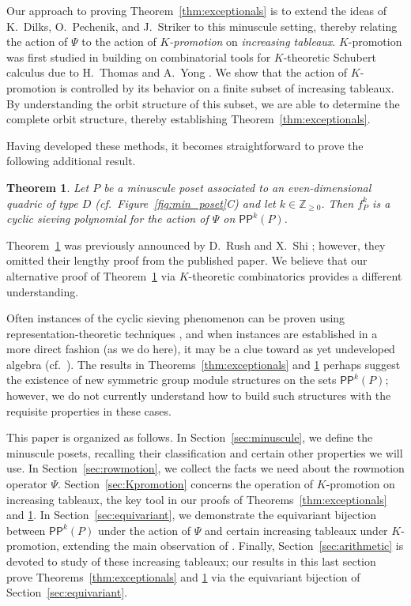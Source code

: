 \documentclass[12pt]{amsart}
\newtheorem{theorem}{Theorem}[section]
\theoremstyle{definition}
\theoremstyle{remark}
\numberwithin{equation}{section}
\newcommand{\pp}{\ensuremath{\mathsf{PP}}}
\begin{document}
Our approach to proving Theorem~\ref{thm:exceptionals} is to extend the ideas of K.~Dilks, O.~Pechenik, and J.~Striker \cite{DPS} to this minuscule setting, thereby relating the action of $\Psi$ to the action of \emph{$K$-promotion} on \emph{increasing tableaux}. $K$-promotion was first studied in \cite{Pechenik} building on combinatorial tools for $K$-theoretic Schubert calculus due to H.~Thomas and A.~Yong \cite{Thomas.Yong:K}. We show that the action of $K$-promotion is controlled by its behavior on a finite subset of increasing tableaux. By understanding the orbit structure of this subset, we are able to determine the complete orbit structure, thereby establishing Theorem~\ref{thm:exceptionals}.

Having developed these methods, it becomes straightforward to prove the following additional result.
\begin{theorem}\label{thm:propeller}
Let $P$ be a minuscule poset associated to an even-dimensional quadric of type $D$ (cf.~Figure~\ref{fig:min_poset}C) and let $k \in \mathbb{Z}_{\geq 0}$. Then $f_P^k$ is a cyclic sieving polynomial for the action of $\Psi$ on $\pp^k(P)$.
\end{theorem}
Theorem~\ref{thm:propeller} was previously announced by D.~Rush and X.~Shi \cite[Theorem~10.1]{Rush.Shi}; however, they omitted their lengthy proof \cite[]{Rush.Shi:report} from the published paper. We believe that our alternative proof of Theorem~\ref{thm:propeller} via $K$-theoretic combinatorics provides a different understanding.

Often instances of the cyclic sieving phenomenon can be proven using representation-theoretic techniques \cite{Reiner.Stanton.White, Rhoades:thesis}, and when instances are established in a more direct fashion (as we do here), it may be a clue toward as yet undeveloped algebra (cf.\ \cite{Rhoades:skein}). The results in Theorems~\ref{thm:exceptionals} and \ref{thm:propeller} perhaps suggest the existence of new symmetric group module structures on the sets $\pp^k(P)$; however, we do not currently understand how to build such structures with the requisite properties in these cases.

This paper is organized as follows. In Section~\ref{sec:minuscule}, we define the minuscule posets, recalling their classification and certain other properties we will use. In Section~\ref{sec:rowmotion}, we collect the facts we need about the rowmotion operator $\Psi$. Section~\ref{sec:Kpromotion} concerns the operation of $K$-promotion on increasing tableaux, the key tool in our proofs of Theorems~\ref{thm:exceptionals} and \ref{thm:propeller}. In Section~\ref{sec:equivariant}, we demonstrate the equivariant bijection between $\pp^k(P)$ under the action of $\Psi$ and certain increasing tableaux under $K$-promotion, extending the main observation of \cite{DPS}.
Finally, Section~\ref{sec:arithmetic} is devoted to study of these increasing tableaux; our results in this last section prove Theorems~\ref{thm:exceptionals} and \ref{thm:propeller} via the equivariant bijection of Section~\ref{sec:equivariant}.
\end{document}
